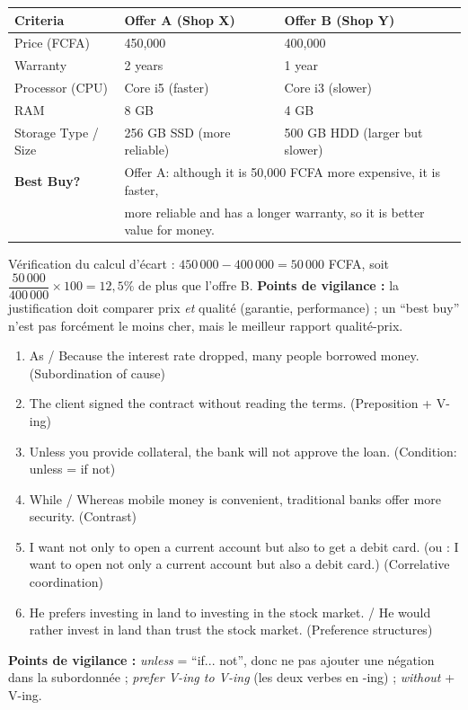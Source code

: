 \documentclass[11pt]{article}
\newcommand{\cle}[1]{{\popxbold\color{popdark}#1}}
\begin{document}
\begin{corrige}
\begin{center}
\begin{tabularx}{\linewidth}{|l|X|X|}
\hline
\rowcolor{popblueL}
\textbf{Criteria} & \textbf{Offer A (Shop X)} & \textbf{Offer B (Shop Y)} \\ \hline
Price (FCFA) & 450,000 & 400,000 \\ \hline
Warranty & 2 years & 1 year \\ \hline
Processor (CPU) & Core i5 (faster) & Core i3 (slower) \\ \hline
RAM & 8 GB & 4 GB \\ \hline
Storage Type / Size & 256 GB SSD (more reliable) & 500 GB HDD (larger but slower) \\ \hline
\rowcolor{popgreenL}
\textbf{Best Buy?} & \multicolumn{2}{l|}{Offer A: although it is 50,000 FCFA more expensive, it is faster,} \\
 & \multicolumn{2}{l|}{more reliable and has a longer warranty, so it is better value for money.} \\ \hline
\end{tabularx}
\end{center}
Vérification du calcul d'écart : $450\,000 - 400\,000 = 50\,000$ FCFA, soit $\dfrac{50\,000}{400\,000} \times 100 = 12,5\%$ de plus que l'offre B.
\textbf{Points de vigilance :} la justification doit comparer prix \emph{et} qualité (garantie, performance) ; un ``best buy'' n'est pas forcément le moins cher, mais le meilleur rapport qualité-prix.
\end{corrige}

\begin{corrige}
\begin{enumerate}
    \item As / Because the interest rate dropped, many people borrowed money. (\cle{Subordination of cause})
    \item The client signed the contract without reading the terms. (\cle{Preposition + V-ing})
    \item Unless you provide collateral, the bank will not approve the loan. (\cle{Condition: unless = if not})
    \item While / Whereas mobile money is convenient, traditional banks offer more security. (\cle{Contrast})
    \item I want not only to open a current account but also to get a debit card. (ou : I want to open not only a current account but also a debit card.) (\cle{Correlative coordination})
    \item He prefers investing in land to investing in the stock market. / He would rather invest in land than trust the stock market. (\cle{Preference structures})
\end{enumerate}
\textbf{Points de vigilance :} \emph{unless} = ``if... not'', donc ne pas ajouter une négation dans la subordonnée ; \emph{prefer V-ing to V-ing} (les deux verbes en -ing) ; \emph{without} + V-ing.
\end{corrige}
\end{document}
